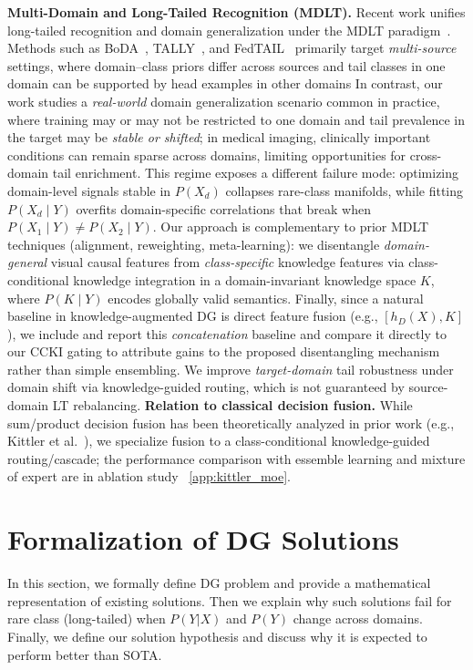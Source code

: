 \documentclass[runningheads]{llncs}
\begin{document}
\noindent\textbf{Multi-Domain and Long-Tailed Recognition (MDLT).}
Recent work unifies long-tailed recognition and domain generalization under the MDLT paradigm~\cite{Yang22}. Methods such as BoDA~\cite{Yang22}, TALLY~\cite{Yao22}, and FedTAIL~\cite{Su24} primarily target \emph{multi-source} settings, where domain--class priors differ across sources and tail classes in one domain can be supported by head examples in other domains \cite{CXR24, Shu21} In contrast, our work studies a \emph{real-world} domain generalization scenario common in practice, where training may or may not be restricted to one domain and tail prevalence in the target may be \emph{stable or shifted}; in medical imaging, clinically important conditions can remain sparse across domains, limiting opportunities for cross-domain tail enrichment. This regime exposes a different failure mode: optimizing domain-level signals stable in $P(X_d)$ collapses rare-class manifolds, while fitting $P(X_d \mid Y)$ overfits domain-specific correlations that break when $P(X_1 \mid Y)\neq P(X_2 \mid Y)$. Our approach is complementary to prior MDLT techniques (alignment, reweighting, meta-learning): we disentangle \emph{domain-general} visual causal features from \emph{class-specific} knowledge features via class-conditional knowledge integration in a domain-invariant knowledge space $K$, where $P(K\mid Y)$ encodes globally valid semantics. Finally, since a natural baseline in knowledge-augmented DG is direct feature fusion (e.g., $[h_D(X),K]$), we include and report this \emph{concatenation} baseline and compare it directly to our CCKI gating to attribute gains to the proposed disentangling mechanism rather than simple ensembling. \noindent We improve \emph{target-domain} tail robustness under domain shift via knowledge-guided routing, which is not guaranteed by source-domain LT rebalancing.
\noindent\textbf{Relation to classical decision fusion.}
While sum/product decision fusion has been theoretically analyzed in prior work (e.g., Kittler et al.~\cite{kittler1998}), we specialize fusion to a class-conditional knowledge-guided routing/cascade; the performance comparison with essemble learning and mixture of expert are in ablation study ~\ref{app:kittler_moe}.

\section{Formalization of DG Solutions}
In this section, we formally define DG problem and provide a mathematical representation of existing solutions. Then we explain why such solutions fail for rare class (long-tailed) when $P(Y|X)$ and $P(Y)$ change across domains. Finally, we define our solution hypothesis and discuss why it is expected to perform better than SOTA.
\end{document}
